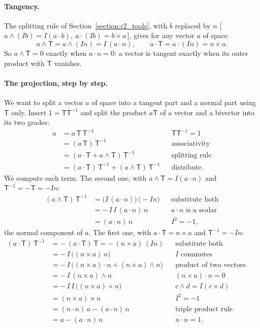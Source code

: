 \paragraph{Tangency.} The splitting rule of Section~\ref{section:r2_tools}, with $b$ replaced by $n$ [\,$a\wedge(Ib) = I(a\cdot b),\ a\cdot(Ib) = b\times a$\,], gives for any vector $a$ of space
\begin{equation*}
a\wedge \mathsf T = a\wedge (I n) = I\,(a\cdot n), \qquad a\cdot \mathsf T = a\cdot(In) = n \times a .
\end{equation*}
So $a\wedge\mathsf T = 0$ exactly when $a\cdot n = 0$: a vector is tangent exactly when its outer product with $\mathsf T$ vanishes.

\paragraph{The projection, step by step.} We want to split a vector $a$ of space into a tangent part and a normal part using $\mathsf T$ only. Insert $1 = \mathsf T\mathsf T^{-1}$ and split the product $a\mathsf T$ of a vector and a bivector into its two grades:
\begin{align*}
a &= a\,\mathsf T\,\mathsf T^{-1} && \mathsf T\mathsf T^{-1} = 1 \\
&= (a\,\mathsf T)\,\mathsf T^{-1} && \text{associativity} \\
&= (a\cdot\mathsf T + a\wedge\mathsf T)\,\mathsf T^{-1} && \text{splitting rule} \\
&= (a\cdot\mathsf T)\,\mathsf T^{-1} + (a\wedge\mathsf T)\,\mathsf T^{-1} && \text{distribute.}
\end{align*}
We compute each term. The second one, with $a\wedge\mathsf T = I(a\cdot n)$ and $\mathsf T^{-1} = -\mathsf T = -In$:
\begin{align*}
(a\wedge\mathsf T)\,\mathsf T^{-1} &= \big(I\,(a\cdot n)\big)\,\big(-I n\big) && \text{substitute both} \\
&= -\,I\,I\,(a\cdot n)\, n && a\cdot n \text{ is a scalar} \\
&= (a\cdot n)\, n && I^2 = -1 ,
\end{align*}
the normal component of $a$. The first one, with $a\cdot\mathsf T = n\times a$ and $\mathsf T^{-1} = -In$:
\begin{align*}
(a\cdot\mathsf T)\,\mathsf T^{-1} &= -\,(a\cdot\mathsf T)\,\mathsf T = -\,(n\times a)\,(I n) && \text{substitute both} \\
&= -\,I\,\big((n\times a)\, n\big) && I \text{ commutes} \\
&= -\,I\,\big((n\times a)\cdot n + (n\times a)\wedge n\big) && \text{product of two vectors} \\
&= -\,I\,(n\times a)\wedge n && (n\times a)\cdot n = 0 \\
&= -\,I\,I\,\big((n\times a)\times n\big) && c\wedge d = I(c\times d) \\
&= (n\times a)\times n && I^2 = -1 \\
&= (n\cdot n)\, a - (a\cdot n)\, n && \text{triple product rule (below)} \\
&= a - (a\cdot n)\, n && n\cdot n = 1 .
\end{align*}
